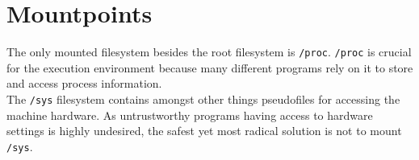 \section{Mountpoints}

The only mounted filesystem besides the root filesystem is \texttt{/proc}. \texttt{/proc} is crucial for the execution environment because many
different programs rely on it to store and access process information.\\
The \texttt{/sys} filesystem contains amongst other things pseudofiles for accessing the machine hardware. As untrustworthy programs
having access to hardware settings is highly undesired, the safest yet most radical solution is not to mount \texttt{/sys}.